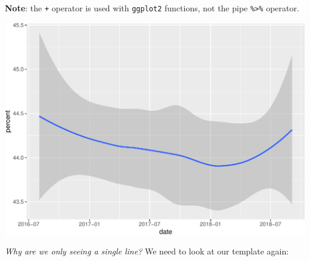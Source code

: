 \documentclass[letterpaper,12pt,twoside,]{pinp}
\begin{document}
\textbf{Note}: the \texttt{+} operator is used with \texttt{ggplot2}
functions, not the pipe \texttt{\%\textgreater{}\%} operator.

\begin{Shaded}
\begin{Highlighting}[]
\SpecialCharTok{+}\SpecialCharTok{::}\NormalTok{()}
\end{Highlighting}
\end{Shaded}

\begin{center}\includegraphics{03-intro-to-ggplot2_files/figure-latex/geom_smooth-1} \end{center}

\emph{Why are we only seeing a single line?} We need to look at our
template again:

\begin{Shaded}
\begin{Highlighting}[]
\SpecialCharTok{\textless{}}\SpecialCharTok{\textgreater{}} \SpecialCharTok{\%\textgreater{}\%} 
  \NormalTok{(} \NormalTok{(} \SpecialCharTok{\textless{}}\SpecialCharTok{\textgreater{}}\NormalTok{, } \SpecialCharTok{\textless{}}\SpecialCharTok{\textgreater{}}\NormalTok{)) }\SpecialCharTok{+} 
    \ErrorTok{\textless{}}\SpecialCharTok{\textgreater{}}\NormalTok{(} \NormalTok{(}\SpecialCharTok{\textless{}}\SpecialCharTok{\textgreater{}}\NormalTok{))}
\end{Highlighting}
\end{Shaded}
\end{document}
